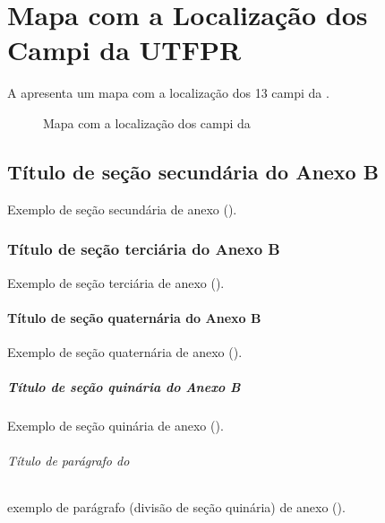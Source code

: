 
\graphicspath{%
  {./Post-Textual/}%
  {./Post-Textual/Illustrations/}%
}

\chapter{Mapa com a Localização dos Campi da UTFPR}%
\label{chpt:anx-b}

A  apresenta um mapa com a localização dos 13 campi da .

\begin{figure}[!htbp]
\caption{Mapa com a localização dos campi da }%
\label{fig:campi-map}
\end{figure}

\section{Título de seção secundária do Anexo B}%
\label{sect:anx-b2}

Exemplo de seção secundária de anexo ().

\subsection{Título de seção terciária do Anexo B}%
\label{ssect:anx-b3}

Exemplo de seção terciária de anexo ().

\subsubsection{Título de seção quaternária do Anexo B}%
\label{sssect:anx-b4}

Exemplo de seção quaternária de anexo ().

\paragraph{Título de seção quinária do Anexo B}%
\label{prgh:anx-b5}

Exemplo de seção quinária de anexo ().

\subparagraph{Título de parágrafo do }%
\label{sprgh:anx-b6}

exemplo de parágrafo (divisão de seção quinária) de anexo ().
